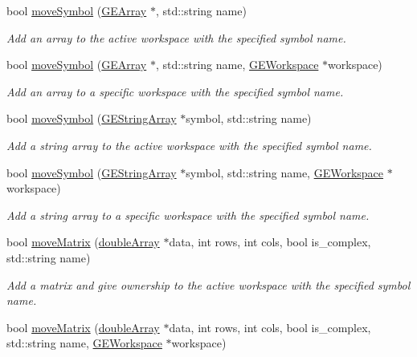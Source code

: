 \begin{DoxyCompactItemize}
bool \hyperlink{class_g_a_u_s_s_a0bf86a27d74366a93876243eafb1e0df}{move\+Symbol} (\hyperlink{class_g_e_array}{G\+E\+Array} $\ast$, std\+::string name)
\begin{DoxyCompactList}\small\item\em Add an array to the active workspace with the specified symbol name. \end{DoxyCompactList}\item 
bool \hyperlink{class_g_a_u_s_s_a8bcab9539db9c3c65cc76391f075ecf0}{move\+Symbol} (\hyperlink{class_g_e_array}{G\+E\+Array} $\ast$, std\+::string name, \hyperlink{class_g_e_workspace}{G\+E\+Workspace} $\ast$workspace)
\begin{DoxyCompactList}\small\item\em Add an array to a specific workspace with the specified symbol name. \end{DoxyCompactList}\item 
bool \hyperlink{class_g_a_u_s_s_a6f90d1a3b4fe9a4eaadc29e4df78ee6d}{move\+Symbol} (\hyperlink{class_g_e_string_array}{G\+E\+String\+Array} $\ast$symbol, std\+::string name)
\begin{DoxyCompactList}\small\item\em Add a string array to the active workspace with the specified symbol name. \end{DoxyCompactList}\item 
bool \hyperlink{class_g_a_u_s_s_aaa4c58f16202914263f59de1dcaeeb7c}{move\+Symbol} (\hyperlink{class_g_e_string_array}{G\+E\+String\+Array} $\ast$symbol, std\+::string name, \hyperlink{class_g_e_workspace}{G\+E\+Workspace} $\ast$workspace)
\begin{DoxyCompactList}\small\item\em Add a string array to a specific workspace with the specified symbol name. \end{DoxyCompactList}\item 
bool \hyperlink{class_g_a_u_s_s_ad178c9413021c4f0a9d49f742b227870}{move\+Matrix} (\hyperlink{classdouble_array}{double\+Array} $\ast$data, int rows, int cols, bool is\+\_\+complex, std\+::string name)
\begin{DoxyCompactList}\small\item\em Add a matrix and give ownership to the active workspace with the specified symbol name. \end{DoxyCompactList}\item 
bool \hyperlink{class_g_a_u_s_s_a822411202e74244e4c7b9fc6e426f59f}{move\+Matrix} (\hyperlink{classdouble_array}{double\+Array} $\ast$data, int rows, int cols, bool is\+\_\+complex, std\+::string name, \hyperlink{class_g_e_workspace}{G\+E\+Workspace} $\ast$workspace)

\end{DoxyCompactItemize}
